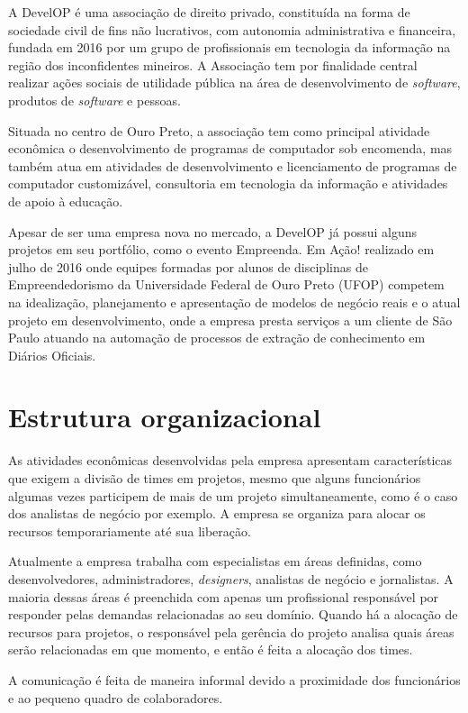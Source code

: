 \documentclass[
12pt,				%
openright,			%
oneside,			%
a4paper,			%
english,			%
french,				%
spanish,			%
brazil,				%
]{abntex2}
\begin{document}
A DevelOP é uma associação de direito privado, constituída na forma de sociedade civil de fins não lucrativos, com autonomia administrativa e financeira, fundada em 2016 por um grupo de profissionais em tecnologia da informação na região dos inconfidentes mineiros. A Associação tem por finalidade central realizar ações sociais de utilidade pública na área de desenvolvimento de \textit{software}, produtos de \textit{software} e pessoas.

Situada no centro de Ouro Preto, a associação tem como principal atividade econômica o desenvolvimento de programas de computador sob encomenda, mas também atua em atividades de desenvolvimento e licenciamento de programas de computador customizável, consultoria em tecnologia da informação e atividades de apoio à educação.

Apesar de ser uma empresa nova no mercado, a DevelOP já possui alguns projetos em seu portfólio, como o evento Empreenda. Em Ação! realizado em julho de 2016 onde equipes formadas por alunos de disciplinas de Empreendedorismo da Universidade Federal de Ouro Preto (UFOP) competem na idealização, planejamento e apresentação de modelos de negócio reais e o atual projeto em desenvolvimento, onde a empresa presta serviços a um cliente de São Paulo atuando na automação de processos de extração de conhecimento em Diários Oficiais.

\section{Estrutura organizacional}

As atividades econômicas desenvolvidas pela empresa apresentam características que exigem a divisão de times em projetos, mesmo que alguns funcionários algumas vezes participem de mais de um projeto simultaneamente, como é o caso dos analistas de negócio por exemplo. A empresa se organiza para alocar os recursos temporariamente até sua liberação.

Atualmente a empresa trabalha com especialistas em áreas definidas, como desenvolvedores, administradores, \textit{designers}, analistas de negócio e jornalistas. A maioria dessas áreas é preenchida com apenas um profissional responsável por responder pelas demandas relacionadas ao seu domínio. Quando há a alocação de recursos para projetos, o responsável pela gerência do projeto analisa quais áreas serão relacionadas em que momento, e então é feita a alocação dos times.

A comunicação é feita de maneira informal devido a proximidade dos funcionários e ao pequeno quadro de colaboradores.
\end{document}
